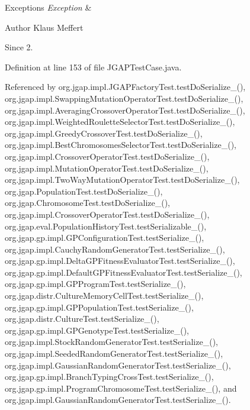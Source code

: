 \begin{DoxyExceptions}{Exceptions}
{\em Exception} & \\
\hline
\end{DoxyExceptions}
\begin{DoxyAuthor}{Author}
Klaus Meffert 
\end{DoxyAuthor}
\begin{DoxySince}{Since}
2. 
\end{DoxySince}


Definition at line 153 of file J\-G\-A\-P\-Test\-Case.\-java.



Referenced by org.\-jgap.\-impl.\-J\-G\-A\-P\-Factory\-Test.\-test\-Do\-Serialize\-\_(), org.\-jgap.\-impl.\-Swapping\-Mutation\-Operator\-Test.\-test\-Do\-Serialize\-\_(), org.\-jgap.\-impl.\-Averaging\-Crossover\-Operator\-Test.\-test\-Do\-Serialize\-\_(), org.\-jgap.\-impl.\-Weighted\-Roulette\-Selector\-Test.\-test\-Do\-Serialize\-\_(), org.\-jgap.\-impl.\-Greedy\-Crossover\-Test.\-test\-Do\-Serialize\-\_(), org.\-jgap.\-impl.\-Best\-Chromosomes\-Selector\-Test.\-test\-Do\-Serialize\-\_(), org.\-jgap.\-impl.\-Crossover\-Operator\-Test.\-test\-Do\-Serialize\-\_(), org.\-jgap.\-impl.\-Mutation\-Operator\-Test.\-test\-Do\-Serialize\-\_(), org.\-jgap.\-impl.\-Two\-Way\-Mutation\-Operator\-Test.\-test\-Do\-Serialize\-\_(), org.\-jgap.\-Population\-Test.\-test\-Do\-Serialize\-\_(), org.\-jgap.\-Chromosome\-Test.\-test\-Do\-Serialize\-\_(), org.\-jgap.\-impl.\-Crossover\-Operator\-Test.\-test\-Do\-Serialize\-\_(), org.\-jgap.\-eval.\-Population\-History\-Test.\-test\-Serializable\-\_(), org.\-jgap.\-gp.\-impl.\-G\-P\-Configuration\-Test.\-test\-Serialize\-\_(), org.\-jgap.\-impl.\-Cauchy\-Random\-Generator\-Test.\-test\-Serialize\-\_(), org.\-jgap.\-gp.\-impl.\-Delta\-G\-P\-Fitness\-Evaluator\-Test.\-test\-Serialize\-\_(), org.\-jgap.\-gp.\-impl.\-Default\-G\-P\-Fitness\-Evaluator\-Test.\-test\-Serialize\-\_(), org.\-jgap.\-gp.\-impl.\-G\-P\-Program\-Test.\-test\-Serialize\-\_(), org.\-jgap.\-distr.\-Culture\-Memory\-Cell\-Test.\-test\-Serialize\-\_(), org.\-jgap.\-gp.\-impl.\-G\-P\-Population\-Test.\-test\-Serialize\-\_(), org.\-jgap.\-distr.\-Culture\-Test.\-test\-Serialize\-\_(), org.\-jgap.\-gp.\-impl.\-G\-P\-Genotype\-Test.\-test\-Serialize\-\_(), org.\-jgap.\-impl.\-Stock\-Random\-Generator\-Test.\-test\-Serialize\-\_(), org.\-jgap.\-impl.\-Seeded\-Random\-Generator\-Test.\-test\-Serialize\-\_(), org.\-jgap.\-impl.\-Gaussian\-Random\-Generator\-Test.\-test\-Serialize\-\_(), org.\-jgap.\-gp.\-impl.\-Branch\-Typing\-Cross\-Test.\-test\-Serialize\-\_(), org.\-jgap.\-gp.\-impl.\-Program\-Chromosome\-Test.\-test\-Serialize\-\_(), and org.\-jgap.\-impl.\-Gaussian\-Random\-Generator\-Test.\-test\-Serialize\-\_().


